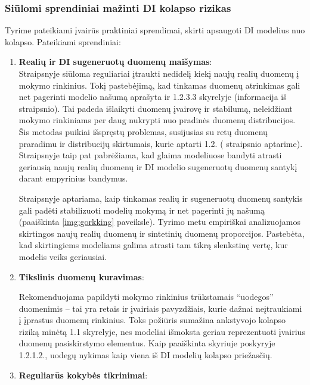 \documentclass{VUMIFInfKursinis}
\begin{document}
\subsubsection{Siūlomi sprendiniai mažinti DI kolapso rizikas}

Tyrime \cite{DesniuPasiulymai} pateikiami įvairūs praktiniai sprendimai, skirti apsaugoti DI modelius nuo kolapso. Pateikiami sprendiniai:

\begin{enumerate}
    \item \textbf{Realių ir DI sugeneruotų duomenų maišymas}:
    \\
        Straipsnyje siūloma reguliariai įtraukti nedidelį kiekį naujų realių duomenų į mokymo rinkinius. Tokį pastebėjimą, kad tinkamas duomenų atrinkimas gali net pagerinti modelio našumą aprašyta ir 1.2.3.3 skyrelyje (informacija iš \cite{ModelsGoMAD} straipsnio). Tai padeda išlaikyti duomenų įvairovę ir stabilumą, neleidžiant mokymo rinkiniams per daug nukrypti nuo pradinės duomenų distribucijos. Šis metodas puikiai išspręstų problemas, susijusias su retų duomenų praradimu ir distribucijų skirtumais, kurie aptarti  1.2. ( \cite{AICollapseNature} straipsnio aptarime). Straipsnyje \cite{DesniuPasiulymai} taip pat pabrėžiama, kad glaima modeliuose bandyti atrasti geriausią naujų realių duomenų ir DI modelio sugeneruotų duomenų santykį darant empyrinius bandymus.
     
        Straipsnyje \cite{DesniuPasiulymai}
        aptariama, kaip tinkamas realių ir sugeneruotų duomenų santykis gali padėti stabilizuoti modelių mokymą ir net pagerinti jų našumą (paaiškinta \ref{img:gorkking} paveiksle). Tyrimo metu empiriškai analizuojamos skirtingos naujų realių duomenų ir sintetinių duomenų proporcijos. Pastebėta, kad skirtingiems modeliams galima atrasti tam tikrą slenkstinę vertę, kur modelis veiks geriausiai. 

    \item \textbf{Tikslinis duomenų kuravimas}:
    
        Rekomenduojama papildyti mokymo rinkinius trūkstamais \enquote{uodegos} duomenimis – tai yra retais ir įvairiais pavyzdžiais, kurie dažnai neįtraukiami į įprastus duomenų rinkinius.
        Toks požiūris sumažina ankstyvojo kolapso riziką minėtą 1.1 skyrelyje, nes modeliai išmoksta geriau reprezentuoti įvairius duomenų pasiskirstymo elementus. Kaip paaiškinta skyriuje poskyryje 1.2.1.2., uodegų nykimas kaip viena iš DI modelių kolapso priežasčių.
   

    \item \textbf{Reguliarūs kokybės tikrinimai}:
    

\end{enumerate}
\end{document}
